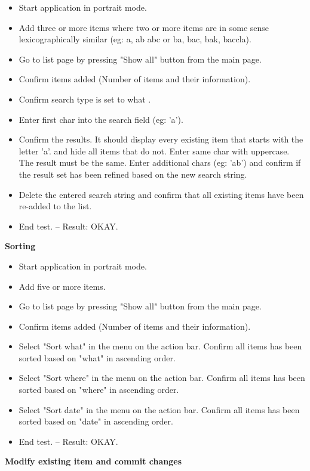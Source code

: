 \documentclass{article}
\begin{document}
\begin{itemize}
	\item Start application in portrait mode.
	\item Add three or more items where two or more items are in some sense lexicographically similar (eg: a, ab abc or ba, bac, bak, baccla).
	\item Go to list page by pressing "Show all" button from the main page.
	\item Confirm items added (Number of items and their information).
	\item Confirm search type is set to what .
	\item Enter first char into the search field (eg: 'a').
	\item Confirm the results. It should display every existing item that starts with the letter 'a'. and hide all items that do not.
	\subitem Enter same char with uppercase. The result must be the same.
	\subitem Enter additional chars (eg: 'ab') and confirm if the result set has been refined based on the new search string.
	\item Delete  the entered  search string and confirm that all existing items have been re-added to the list.
	\item End test. -- Result: OKAY.
\end{itemize}\textbf{Sorting}
\begin{itemize}
	\item Start application in portrait mode.
	\item Add five or more items.
	\item Go to list page by pressing "Show all" button from the main page.
	\item Confirm items added (Number of items and their information).
	\item Select "Sort what" in the menu on the action bar.
	\subitem Confirm all items has been sorted based on "what" in ascending order.
	\item Select "Sort where" in the menu on the action bar.
	\subitem Confirm all items has been sorted based on "where" in ascending order.
	\item Select "Sort date" in the menu on the action bar.
	\subitem Confirm all items has been sorted based on "date" in ascending order.
	\item End test. -- Result: OKAY.
\end{itemize}
\textbf{Modify existing item and commit changes}
\end{document}
